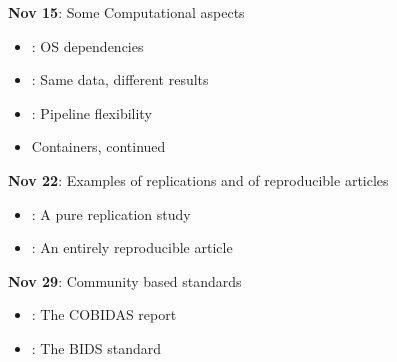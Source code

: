 \documentclass[11pt, letter]{article}
\begin{document}
\noindent\textbf{Nov 15}: Some Computational aspects
\begin{itemize}
\item[] {\color{pink}{\Rectangle}} \cite{glatard2015reproducibility}: OS dependencies
\item[] {\color{pink}{\Rectangle}} \cite{bowring2018exploring}: Same data, different results
\item[] {\color{pink}{\Rectangle}} \cite{carp2012plurality}: Pipeline flexibility
\item[] {\color{green}{\Rectangle}} Containers, continued
\end{itemize}

\noindent\textbf{Nov 22}: Examples of replications and of reproducible articles
\begin{itemize}
\item[] {\color{pink}{\Rectangle}} \cite{boekel2015purely}: A pure replication study
\item[] {\color{pink}{\Rectangle}} \cite{waskom2014frontoparietal}: An entirely reproducible article
\end{itemize}

\noindent\textbf{Nov 29}: Community based standards
\begin{itemize}
\item[] {\color{pink}{\Rectangle}} \cite{nichols2017best}: The COBIDAS report
\item[] {\color{pink}{\Rectangle}} \cite{gorgolewski2016brain}: The BIDS standard
\end{itemize}

\vspace*{.15in}



\end{document}
